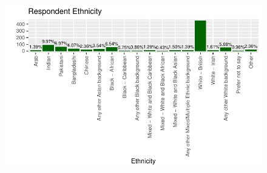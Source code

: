 \documentclass[
  letterpaper,
  DIV=11,
  numbers=noendperiod]{scrartcl}
\begin{document}
\begin{figure}[H]

{\centering \includegraphics{final_draft_files/figure-pdf/ethnicity-1.pdf}

}

\end{figure}
\end{document}
